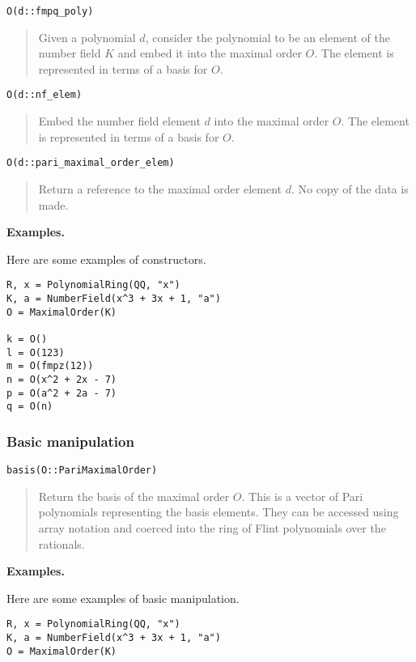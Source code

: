 \documentclass[a4paper,10pt]{article}
\newcommand{\desc}[1]{\vspace{-3mm}\begin{quote}#1\end{quote}}
\begin{document}
{{\begin{lstlisting}
O(d::fmpq_poly)
\end{lstlisting}

\desc{Given a polynomial $d$, consider the polynomial to be an element of the
number field $K$ and embed it into the maximal order $O$. The element is
represented in terms of a basis for $O$.}

\begin{lstlisting}
O(d::nf_elem)
\end{lstlisting}

\desc{Embed the number field element $d$ into the maximal order $O$. The element
is represented in terms of a basis for $O$.}

\begin{lstlisting}
O(d::pari_maximal_order_elem)
\end{lstlisting}

\desc{Return a reference to the maximal order element $d$. No copy of the data is
made.}

\textbf{Examples.}

Here are some examples of constructors.

\begin{lstlisting}
R, x = PolynomialRing(QQ, "x")
K, a = NumberField(x^3 + 3x + 1, "a")
O = MaximalOrder(K)

k = O()
l = O(123)
m = O(fmpz(12))
n = O(x^2 + 2x - 7)
p = O(a^2 + 2a - 7)
q = O(n)
\end{lstlisting}

\subsubsection{Basic manipulation}

\begin{lstlisting}
basis(O::PariMaximalOrder)
\end{lstlisting}

\desc{Return the basis of the maximal order $O$. This is a vector of Pari
polynomials representing the basis elements. They can be accessed using
array notation and coerced into the ring of Flint polynomials over the
rationals.}

\textbf{Examples.}

Here are some examples of basic manipulation.

\begin{lstlisting}
R, x = PolynomialRing(QQ, "x")
K, a = NumberField(x^3 + 3x + 1, "a")
O = MaximalOrder(K)


\end{lstlisting}}}
\end{document}
